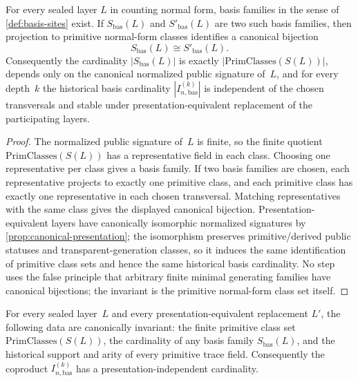 \documentclass{lmcs}
\newcommand{\PrimClasses}{\mathrm{PrimClasses}}
\begin{document}
\begin{thm}
\label{thm:basis-choice}
For every sealed layer $L$ in counting normal form, basis families in the sense of \autoref{def:basis-sites} exist. If $S_{\mathrm{bas}}(L)$ and $S'_{\mathrm{bas}}(L)$ are two such basis families, then projection to primitive normal-form classes identifies a canonical bijection
\[
  S_{\mathrm{bas}}(L) \cong S'_{\mathrm{bas}}(L).
\]
Consequently the cardinality $|S_{\mathrm{bas}}(L)|$ is exactly $|\PrimClasses(S(L))|$, depends only on the canonical normalized public signature of~$L$, and for every depth~$k$ the historical basis cardinality $|I_{n,\mathrm{bas}}^{(k)}|$ is independent of the chosen transversals and stable under presentation-equivalent replacement of the participating layers.
\end{thm}

\begin{proof}
The normalized public signature of~$L$ is finite, so the finite quotient $\PrimClasses(S(L))$ has a representative field in each class. Choosing one representative per class gives a basis family. If two basis families are chosen, each representative projects to exactly one primitive class, and each primitive class has exactly one representative in each chosen transversal. Matching representatives with the same class gives the displayed canonical bijection. Presentation-equivalent layers have canonically isomorphic normalized signatures by \autoref{prop:canonical-presentation}; the isomorphism preserves primitive/derived public statuses and transparent-generation classes, so it induces the same identification of primitive class sets and hence the same historical basis cardinality. No step uses the false principle that arbitrary finite minimal generating families have canonical bijections; the invariant is the primitive normal-form class set itself.
\end{proof}

\begin{lem}
\label{lem:basis-invariants}
For every sealed layer~$L$ and every presentation-equivalent replacement
$L'$, the following data are canonically invariant: the finite primitive class
set $\PrimClasses(S(L))$, the cardinality of any basis family
$S_{\mathrm{bas}}(L)$, and the historical support and arity of every primitive
trace field. Consequently the coproduct
$I_{n,\mathrm{bas}}^{(k)}$ has a presentation-independent cardinality.
\end{lem}
\end{document}
